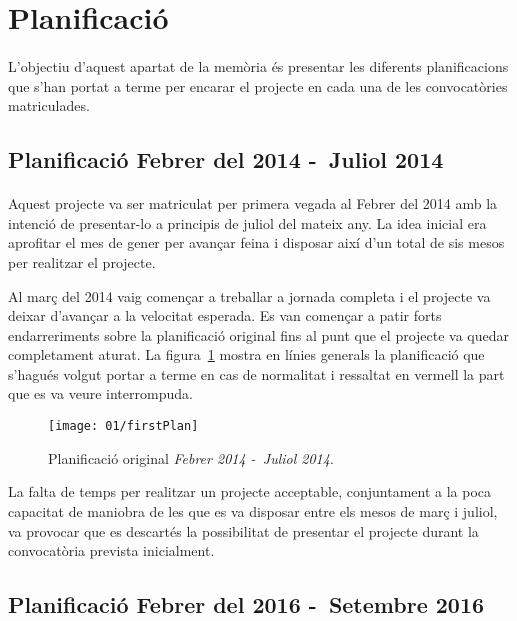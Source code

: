 \section{Planificació}

    \paragraph{}
    L'objectiu d'aquest apartat de la memòria és presentar les diferents planificacions que s'han portat a terme per encarar el projecte en cada una de les convocatòries matriculades.

    \subsection{Planificació Febrer del 2014 -\ Juliol 2014}

        \paragraph{}
        Aquest projecte va ser matriculat per primera vegada al Febrer del 2014 amb la intenció de presentar-lo a principis de juliol del mateix any. La idea inicial era aprofitar el mes de gener per avançar feina i disposar així d’un total de sis mesos per realitzar el projecte.

        Al març del 2014 vaig començar a treballar a jornada completa i el projecte va deixar d’avançar a la velocitat esperada. Es van començar a patir forts endarreriments sobre la planificació original fins al punt que el projecte va quedar completament aturat. La figura~\ref{fig:firstPlan} mostra en línies generals la planificació que s’hagués volgut portar a terme en cas de normalitat i ressaltat en vermell la part que es va veure interrompuda.

        \begin{figure}[h]
                \texttt{[image: 01/firstPlan]}
                \centering
                \caption{Planificació original \emph{Febrer 2014 -\ Juliol 2014}.\label{fig:firstPlan}}
        \end{figure}

        La falta de temps per realitzar un projecte acceptable, conjuntament a la poca capacitat de maniobra de les que es va disposar entre els mesos de març i juliol, va provocar que es descartés la possibilitat de presentar el projecte durant la convocatòria prevista inicialment.

    \subsection{Planificació Febrer del 2016 -\ Setembre 2016}

